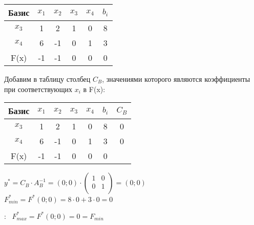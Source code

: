 \begin{center}
    \begin{tabular}{|c | c c c c c|} 
         \hline
            Базис & $x_1$ & $x_2$ & $x_3$ & $x_4$ & $b_i$\\
         \hline
            $x_3$ & 1 & 2 & 1 & 0 & 8\\
         \hline
            $x_4$ & 6 & -1 & 0 & 1 & 3\\
         \hline
            F(x) & -1 & -1 & 0 & 0 & 0\\
         \hline
    \end{tabular}
\end{center}

\begin{flushleft}
Добавим в таблицу столбец $C_{B}$, значениями которого являются коэффициенты при соответствующих $x_i$ в F(x):
\end{flushleft}

\begin{center}
    \begin{tabular}{|c | c c c c c c|} 
         \hline
            Базис & $x_1$ & $x_2$ & $x_3$ & $x_4$ & $b_i$ & $C_{B}$\\
         \hline
            $x_3$ & 1 & 2 & 1 & 0 & 8 & 0\\
         \hline
            $x_4$ & 6 & -1 & 0 & 1 & 3 & 0\\
         \hline
            F(x) & -1 & -1 & 0 & 0 & 0 &\\
         \hline
    \end{tabular}
\end{center}

\begin{flushleft}
$y^{*} = C_{B} \cdot A_{B}^{-1} = (0; 0) \cdot \begin{pmatrix}
1 & 0 \\
0 & 1 \\
\end{pmatrix} = (0; 0)$ \\
$F_{min}^{*} = F^{*}(0; 0) = 8 \cdot 0 + 3 \cdot 0 = 0$
\end{flushleft}

{:~} $F_{max}^{*} = F^{*}(0; 0) = 0 = F_{min}$
